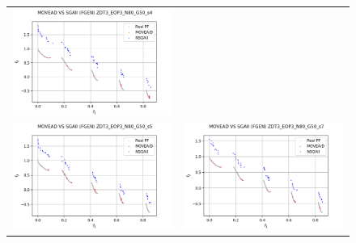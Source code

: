 \begin{figure}[H]
\begin{tabular}{c c}
    \includegraphics[scale=0.5]{figures/ZDT3_EOP3_N80_G50_T12/s4_comp.png}\\
    \includegraphics[scale=0.5]{figures/ZDT3_EOP3_N80_G50_T12/s5_comp.png} &
    \includegraphics[scale=0.5]{figures/ZDT3_EOP3_N80_G50_T12/s7_comp.png}\\

\end{tabular}
\end{figure}
